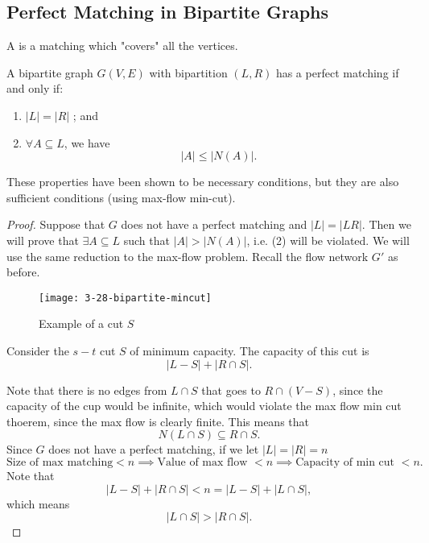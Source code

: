 \documentclass[../main/main.tex]{subfiles}
\begin{document}
	\subsection{Perfect Matching in Bipartite Graphs}

\begin{definition}
	A  is a matching which "covers" all the vertices.
\end{definition}
\begin{theorem}
	A bipartite graph $G(V,E)$ with bipartition $\left( L,R \right) $ has a perfect matching if and only if: 
	\begin{enumerate}
		\item $|L|=|R|$ ; and 
		\item $\forall A\subseteq L$, we have \[
				|A|\le |N(A)|
		.\]  
	\end{enumerate}
	These properties have been shown to be necessary conditions, but they are also sufficient conditions (using max-flow min-cut).
\end{theorem}

\begin{proof}
	Suppose that $G$ does not have a perfect matching and  $|L|=|LR|$. Then we will prove that  $\exists A\subseteq L$ such that $|A|>|N(A)|$, i.e. (2) will be violated. We will use the same reduction to the max-flow problem. Recall the flow network $G'$ as before.
	\begin{figure}[h!]
		\centering
		\texttt{[image: 3-28-bipartite-mincut]}
		\caption{Example of a cut $S$}
		\label{fig:}
	\end{figure}

	Consider the $s-t$ cut $S$ of minimum capacity. The capacity of this cut is \[
	|L-S|+|R\cap S|
	.\] 

	Note that there is no edges from $L\cap S$ that goes to $R\cap (V-S)$, since the capacity of the cup would be infinite, which would violate the max flow min cut thoerem, since the max flow is clearly finite. This means that  \[
		N(L\cap S)\subseteq R\cap S
	.\]
	Since $G$ does not have a perfect matching, if we let $|L|=|R|=n$  \[
	\text{Size of max matching}<n \implies \text{Value of max flow }< n\implies \text{Capacity of min cut }<n 
	.\] 
	Note that \[
	|L-S|+|R\cap S|<n=|L-S|+|L\cap S|
	,\] which means \[
	|L\cap S|>|R\cap S| 
	.\]  
\end{proof}
\end{document}
